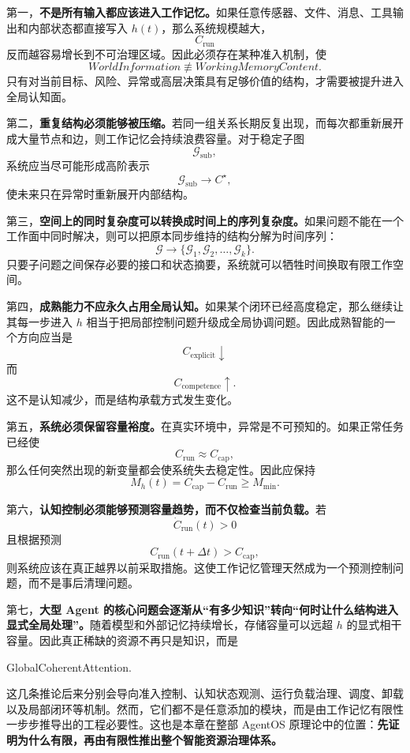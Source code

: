 第一，\textbf{不是所有输入都应该进入工作记忆。}如果任意传感器、文件、消息、工具输出和内部状态都直接写入 $h(t)$，那么系统规模越大，
\[
C_{\mathrm{run}}
\]
反而越容易增长到不可治理区域。因此必须存在某种准入机制，使
\[
WorldInformation
\not\equiv
WorkingMemoryContent.
\]
只有对当前目标、风险、异常或高层决策具有足够价值的结构，才需要被提升进入全局认知面。

第二，\textbf{重复结构必须能够被压缩。}若同一组关系长期反复出现，而每次都重新展开成大量节点和边，则工作记忆会持续浪费容量。对于稳定子图
\[
\mathcal G_{\mathrm{sub}},
\]
系统应当尽可能形成高阶表示
\[
\mathcal G_{\mathrm{sub}}
\rightarrow
C^\star,
\]
使未来只在异常时重新展开内部结构。

第三，\textbf{空间上的同时复杂度可以转换成时间上的序列复杂度。}如果问题不能在一个工作面中同时解决，则可以把原本同步维持的结构分解为时间序列：
\[
\mathcal G
\rightarrow
\{
\mathcal G_1,\mathcal G_2,\ldots,\mathcal G_k
\}.
\]
只要子问题之间保存必要的接口和状态摘要，系统就可以牺牲时间换取有限工作空间。

第四，\textbf{成熟能力不应永久占用全局认知。}如果某个闭环已经高度稳定，那么继续让其每一步进入 $h$ 相当于把局部控制问题升级成全局协调问题。因此成熟智能的一个方向应当是
\[
C_{\mathrm{explicit}}\downarrow
\]
而
\[
C_{\mathrm{competence}}\uparrow.
\]
这不是认知减少，而是结构承载方式发生变化。

第五，\textbf{系统必须保留容量裕度。}在真实环境中，异常是不可预知的。如果正常任务已经使
\[
C_{\mathrm{run}}
\approx
C_{\mathrm{cap}},
\]
那么任何突然出现的新变量都会使系统失去稳定性。因此应保持
\[
M_h(t)
=
C_{\mathrm{cap}}-C_{\mathrm{run}}
\geq
M_{\min}.
\]

第六，\textbf{认知控制必须能够预测容量趋势，而不仅检查当前负载。}若
\[
\dot C_{\mathrm{run}}(t)>0
\]
且根据预测
\[
C_{\mathrm{run}}(t+\Delta t)
>
C_{\mathrm{cap}},
\]
则系统应该在真正越界以前采取措施。这使工作记忆管理天然成为一个预测控制问题，而不是事后清理问题。

第七，\textbf{大型 Agent 的核心问题会逐渐从“有多少知识”转向“何时让什么结构进入显式全局处理”。}随着模型和外部记忆持续增长，存储容量可以远超 $h$ 的显式相干容量。因此真正稀缺的资源不再只是知识，而是
\begin{statementbox}
GlobalCoherentAttention.
\end{statementbox}

这几条推论后来分别会导向准入控制、认知状态观测、运行负载治理、调度、卸载以及局部闭环等机制。然而，它们都不是任意添加的模块，而是由工作记忆有限性一步步推导出的工程必要性。这也是本章在整部 AgentOS 原理论中的位置：\textbf{先证明为什么有限，再由有限性推出整个智能资源治理体系。}


